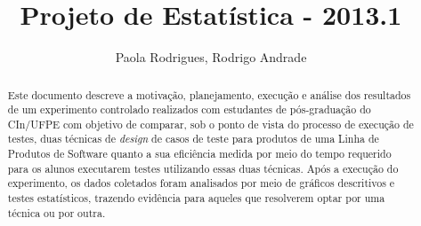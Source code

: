 \documentclass[final,3p,times,twocolumn]{elsarticle}
\begin{document}
\begin{frontmatter}



\title{Projeto de Estat\'istica - 2013.1}


\author{Paola Rodrigues, Rodrigo Andrade}
\address{Centro de Inform\'atica
\\ Universidade Federal de Pernambuco
\\prga,rcaa2@cin.ufpe.br
}

\begin{abstract}
Este documento descreve a  motivação, planejamento, execução e análise dos resultados de um experimento controlado realizados com estudantes de pós-graduação do CIn/UFPE com objetivo de comparar, sob o ponto de vista do processo de execução de testes, duas técnicas de \emph{design} de casos de teste para produtos de uma Linha de Produtos de Software quanto a sua eficiência medida por meio do tempo requerido para os alunos executarem testes utilizando essas duas técnicas. Após a execução do experimento, os dados coletados foram analisados por meio de gráficos descritivos e testes estatísticos, trazendo evidência para aqueles que resolverem optar por uma técnica ou por outra.

\end{abstract}

\end{frontmatter}


\end{document}
